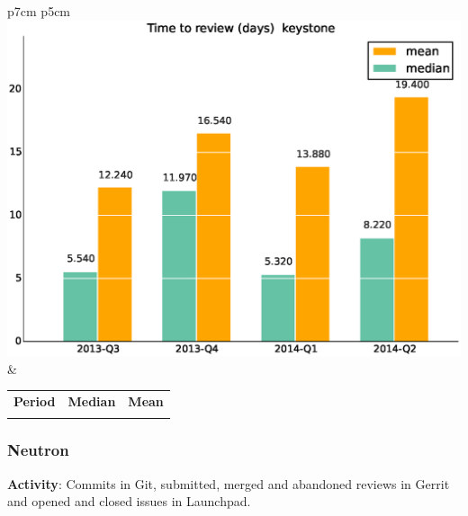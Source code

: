 \documentclass[a4wide,11pt]{report}
\begin{document}
\begin{tabular}{p{7cm} p{5cm}}
    \vspace{0pt} 
    \includegraphics[scale=.35]{figs/timetoreview_mediankeystone.eps}
    & 
    \vspace{0pt}
    \begin{tabular}{l|r|r|}%
    \bfseries Period & \bfseries Median & \bfseries Mean %
    \csvreader[head to column names]{data/timetoreview_mediankeystone.csv}{}%
    {\\ & \mediantime & \meantime}
    \end{tabular}
\end{tabular}

\newpage 
 \subsubsection{Neutron}

\textbf{Activity}: Commits in Git, submitted, merged and abandoned reviews in Gerrit and opened and closed issues in Launchpad.
\end{document}

